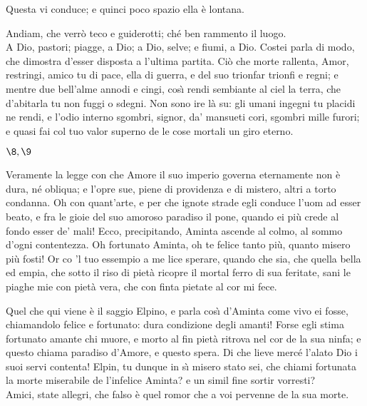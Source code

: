 \documentclass{book}
\begin{document}
    Questa vi conduce;
	e quinci poco spazio ella \`e lontana.

	\2 Andiam, che verr\`o teco e guiderotti;
	ch\'e ben rammento il luogo. \\

   \3 A Dio, pastori;
	piagge, a Dio; a Dio, selve; e fiumi, a Dio.
	 Costei parla di modo, che dimostra
	d'esser disposta a l'ultima partita.
	\9 Ci\`o che morte rallenta, Amor, restringi,
	amico tu di pace, ella di guerra,
	e del suo trionfar trionfi e regni;
	e mentre due bell'alme annodi e cingi,
	cos\`{\i} rendi sembiante al ciel la terra,
	che d'abitarla tu non fuggi o sdegni.
	Non sono ire l\`a su: gli umani ingegni
	tu placidi ne rendi, e l'odio interno
	sgombri, signor, da' mansueti cori,
	sgombri mille furori;
	e quasi fai col tuo valor superno
	de le cose mortali un giro eterno.



\Atto

\(\8, \9\)

	\8 Veramente la legge con che Amore
	il suo imperio governa eternamente
	non \`e dura, n\'e obliqua; e l'opre sue,
	piene di providenza e di mistero,
	altri a torto condanna. Oh con quant'arte,
	e per che ignote strade egli conduce
	l'uom ad esser beato, e fra le gioie
	del suo amoroso paradiso il pone,
	quando ei pi\`u crede al fondo esser de' mali!
	Ecco, precipitando, Aminta ascende
	al colmo, al sommo d'ogni contentezza.
	Oh fortunato Aminta, oh te felice
	tanto pi\`u, quanto misero pi\`u fosti!
	Or co 'l tuo essempio a me lice sperare,
	quando che sia, che quella bella ed empia,
	che sotto il riso di piet\`a ricopre
	il mortal ferro di sua feritate,
	sani le piaghe mie con piet\`a vera,
	che con finta pietate al cor mi fece.

	\9 Quel che qui viene \`e il saggio Elpino, e parla
	cos\`{\i} d'Aminta come vivo ei fosse,
	chiamandolo felice e fortunato:
	dura condizione degli amanti!
	Forse egli stima fortunato amante
	chi muore, e morto al fin piet\`a ritrova
	nel cor de la sua ninfa; e questo chiama
	paradiso d'Amore, e questo spera.
	Di che lieve merc\'e l'alato Dio
	i suoi servi contenta! Elpin, tu dunque
	in s\`{\i} misero stato sei, che chiami
	fortunata la morte miserabile
	de l'infelice Aminta? e un simil fine
	sortir vorresti? \\

   \8 Amici, state allegri,
	che falso \`e quel romor che a voi pervenne
	de la sua morte. \\
\end{document}
